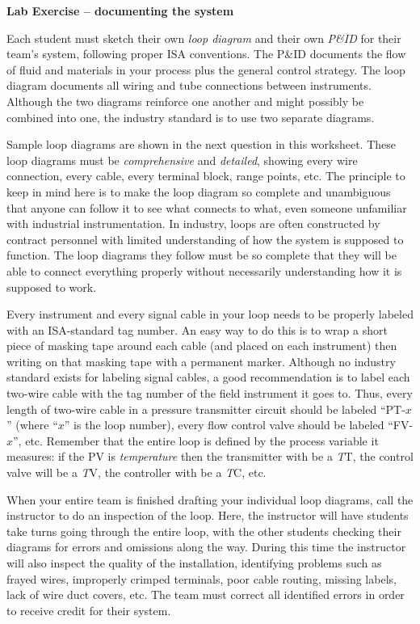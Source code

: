 \documentclass[12pt,a4paper]{book}
\begin{document}
\noindent
{\bf Lab Exercise -- documenting the system}

\vskip 5pt

Each student must sketch their own {\it loop diagram} and their own {\it P\&ID} for their team's system, following proper ISA conventions.  The P\&ID documents the flow of fluid and materials in your process plus the general control strategy.  The loop diagram documents all wiring and tube connections between instruments.  Although the two diagrams reinforce one another and might possibly be combined into one, the industry standard is to use two separate diagrams.

Sample loop diagrams are shown in the next question in this worksheet.  These loop diagrams must be {\it comprehensive} and {\it detailed}, showing every wire connection, every cable, every terminal block, range points, etc.  The principle to keep in mind here is to make the loop diagram so complete and unambiguous that anyone can follow it to see what connects to what, even someone unfamiliar with industrial instrumentation.  In industry, loops are often constructed by contract personnel with limited understanding of how the system is supposed to function.  The loop diagrams they follow must be so complete that they will be able to connect everything properly without necessarily understanding how it is supposed to work.

Every instrument and every signal cable in your loop needs to be properly labeled with an ISA-standard tag number.  An easy way to do this is to wrap a short piece of masking tape around each cable (and placed on each instrument) then writing on that masking tape with a permanent marker.  Although no industry standard exists for labeling signal cables, a good recommendation is to label each two-wire cable with the tag number of the field instrument it goes to.  Thus, every length of two-wire cable in a pressure transmitter circuit should be labeled ``PT-$x$'' (where ``$x$'' is the loop number), every flow control valve should be labeled ``FV-$x$'', etc.  Remember that the entire loop is defined by the process variable it measures: if the PV is {\it temperature} then the transmitter with be a {\it T}T, the control valve will be a {\it T}V, the controller with be a {\it T}C, etc.

When your entire team is finished drafting your individual loop diagrams, call the instructor to do an inspection of the loop.  Here, the instructor will have students take turns going through the entire loop, with the other students checking their diagrams for errors and omissions along the way.  During this time the instructor will also inspect the quality of the installation, identifying problems such as frayed wires, improperly crimped terminals, poor cable routing, missing labels, lack of wire duct covers, etc.  The team must correct all identified errors in order to receive credit for their system.  
\end{document}

